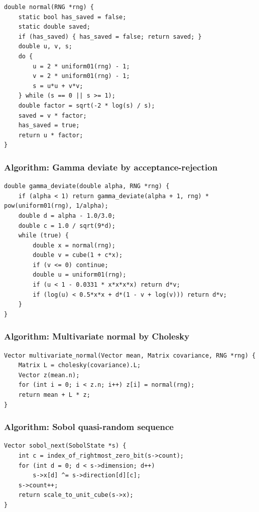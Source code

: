 \documentclass[11pt]{article}
\begin{document}
\begin{verbatim}
double normal(RNG *rng) {
    static bool has_saved = false;
    static double saved;
    if (has_saved) { has_saved = false; return saved; }
    double u, v, s;
    do {
        u = 2 * uniform01(rng) - 1;
        v = 2 * uniform01(rng) - 1;
        s = u*u + v*v;
    } while (s == 0 || s >= 1);
    double factor = sqrt(-2 * log(s) / s);
    saved = v * factor;
    has_saved = true;
    return u * factor;
}
\end{verbatim}

\subsubsection{Algorithm: Gamma deviate by acceptance-rejection}\label{algorithm-gamma-deviate-by-acceptance-rejection}

\begin{verbatim}
double gamma_deviate(double alpha, RNG *rng) {
    if (alpha < 1) return gamma_deviate(alpha + 1, rng) * pow(uniform01(rng), 1/alpha);
    double d = alpha - 1.0/3.0;
    double c = 1.0 / sqrt(9*d);
    while (true) {
        double x = normal(rng);
        double v = cube(1 + c*x);
        if (v <= 0) continue;
        double u = uniform01(rng);
        if (u < 1 - 0.0331 * x*x*x*x) return d*v;
        if (log(u) < 0.5*x*x + d*(1 - v + log(v))) return d*v;
    }
}
\end{verbatim}

\subsubsection{Algorithm: Multivariate normal by Cholesky}\label{algorithm-multivariate-normal-by-cholesky}

\begin{verbatim}
Vector multivariate_normal(Vector mean, Matrix covariance, RNG *rng) {
    Matrix L = cholesky(covariance).L;
    Vector z(mean.n);
    for (int i = 0; i < z.n; i++) z[i] = normal(rng);
    return mean + L * z;
}
\end{verbatim}

\subsubsection{Algorithm: Sobol quasi-random sequence}\label{algorithm-sobol-quasi-random-sequence}

\begin{verbatim}
Vector sobol_next(SobolState *s) {
    int c = index_of_rightmost_zero_bit(s->count);
    for (int d = 0; d < s->dimension; d++)
        s->x[d] ^= s->direction[d][c];
    s->count++;
    return scale_to_unit_cube(s->x);
}
\end{verbatim}
\end{document}
